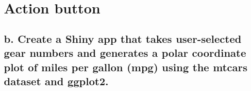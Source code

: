 \documentclass[
]{book}
\newenvironment{Shaded}{\begin{snugshade}}{\end{snugshade}}
\newcommand{\AttributeTok}[1]{\textcolor[rgb]{0.77,0.63,0.00}{#1}}
\newcommand{\CommentTok}[1]{\textcolor[rgb]{0.56,0.35,0.01}{\textit{#1}}}
\newcommand{\ControlFlowTok}[1]{\textcolor[rgb]{0.13,0.29,0.53}{\textbf{#1}}}
\newcommand{\DecValTok}[1]{\textcolor[rgb]{0.00,0.00,0.81}{#1}}
\newcommand{\FunctionTok}[1]{\textcolor[rgb]{0.00,0.00,0.00}{#1}}
\newcommand{\NormalTok}[1]{#1}
\newcommand{\OtherTok}[1]{\textcolor[rgb]{0.56,0.35,0.01}{#1}}
\newcommand{\SpecialCharTok}[1]{\textcolor[rgb]{0.00,0.00,0.00}{#1}}
\newcommand{\StringTok}[1]{\textcolor[rgb]{0.31,0.60,0.02}{#1}}
\begin{document}
\begin{Shaded}
\end{Shaded}

\hypertarget{action-button}{%
\section{Action button}\label{action-button}}

\hypertarget{b.-create-a-shiny-app-that-takes-user-selected-gear-numbers-and-generates-a-polar-coordinate-plot-of-miles-per-gallon-mpg-using-the-mtcars-dataset-and-ggplot2.}{%
\subsection{b. Create a Shiny app that takes user-selected gear numbers and generates a polar coordinate plot of miles per gallon (mpg) using the mtcars dataset and ggplot2.}\label{b.-create-a-shiny-app-that-takes-user-selected-gear-numbers-and-generates-a-polar-coordinate-plot-of-miles-per-gallon-mpg-using-the-mtcars-dataset-and-ggplot2.}}
\end{document}
